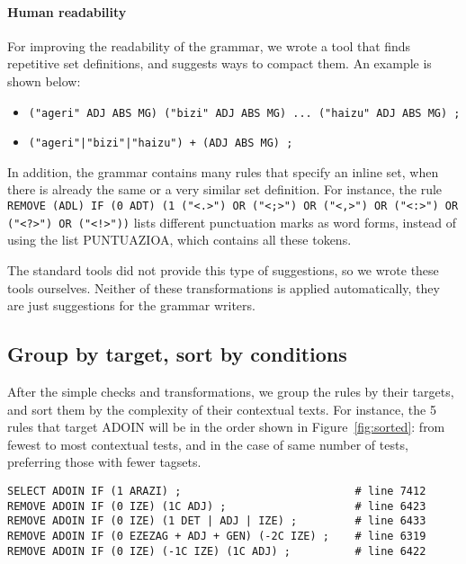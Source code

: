 \documentclass[11pt]{article}
\begin{document}

\paragraph{Human readability}
For improving the readability of the grammar, we wrote a tool that finds repetitive set definitions, and suggests ways to compact them. An example is shown below:

\begin{itemize}
\item [Original definition:] \texttt{("ageri" ADJ ABS MG) ("bizi" ADJ ABS MG) ... ("haizu" ADJ ABS MG) ;}
\item [Compact version:] \texttt{("ageri"|"bizi"|"haizu") + (ADJ ABS MG) ;}

\end{itemize}



In addition, the grammar contains many rules that specify an inline set, when there is already the same or a very similar set definition. For instance, the rule \texttt{REMOVE (ADL) IF (0 ADT) (1 ("<.>") OR ("<;>") OR ("<,>") OR ("<:>") OR ("<?>") OR ("<!>"))} lists different punctuation marks as word forms, instead of using the list PUNTUAZIOA, which contains all these tokens.

The standard tools did not provide this type of suggestions, so we wrote these tools ourselves. Neither of these transformations is applied automatically, they are just suggestions for the grammar writers.



\subsection{Group by target, sort by conditions}
After the simple checks and transformations, we group the rules by their targets, and sort them by the complexity of their contextual texts. For instance, the 5 rules that target ADOIN will be in the order shown in Figure~\ref{fig:sorted}: from fewest to most contextual tests, and in the case of same number of tests, preferring those with fewer tagsets.

\begin{figure*}[ht]
\begin{minipage}{\textwidth}
\label{fig:sorted}
\begin{verbatim}
SELECT ADOIN IF (1 ARAZI) ;                           # line 7412
REMOVE ADOIN IF (0 IZE) (1C ADJ) ;                    # line 6423
REMOVE ADOIN IF (0 IZE) (1 DET | ADJ | IZE) ;         # line 6433
REMOVE ADOIN IF (0 EZEZAG + ADJ + GEN) (-2C IZE) ;    # line 6319
REMOVE ADOIN IF (0 IZE) (-1C IZE) (1C ADJ) ;          # line 6422
\end{verbatim}
\caption{Rules grouped by target, and ordered by their contextual tests.}
\end{minipage}
\end{figure*}
\enlargethispage{-4\baselineskip}
\end{document}

